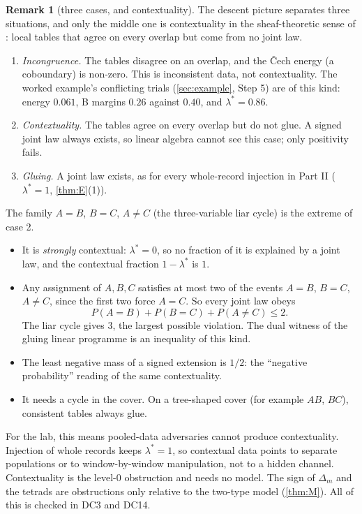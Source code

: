 \documentclass[11pt]{article}
\theoremstyle{definition}\newtheorem{definition}{Definition}\newtheorem{remark}{Remark}
\begin{document}
\begin{remark}[three cases, and contextuality]\label{rem:threecases}
The descent picture separates three situations, and only the middle one is contextuality in the sheaf-theoretic sense of
\cite{AbramskyBrandenburger2011}: local tables that agree on every overlap but come from no joint law.
\begin{enumerate}
\item \emph{Incongruence.} The tables disagree on an overlap, and the Čech energy (a coboundary) is non-zero. This is inconsistent data,
  not contextuality. The worked example's conflicting trials (\cref{sec:example}, Step 5) are of this kind: energy $0.061$, B margins
  $0.26$ against $0.40$, and $\lambda^*=0.86$.
\item \emph{Contextuality.} The tables agree on every overlap but do not glue. A signed joint law always exists, so linear algebra
  cannot see this case; only positivity fails.
\item \emph{Gluing.} A joint law exists, as for every whole-record injection in Part II ($\lambda^*=1$, \cref{thm:E}(1)).
\end{enumerate}
The family $A=B$, $B=C$, $A\ne C$ (the three-variable liar cycle) is the extreme of case 2.
\begin{itemize}
\item It is \emph{strongly} contextual: $\lambda^*=0$, so no fraction of it is explained by a joint law, and the contextual fraction
  $1-\lambda^*$ is $1$.
\item Any assignment of $A,B,C$ satisfies at most two of the events $A=B$, $B=C$, $A\ne C$, since the first two force $A=C$. So every
  joint law obeys
  \[
  P(A=B)+P(B=C)+P(A\ne C)\le2 .
  \]
  The liar cycle gives $3$, the largest possible violation. The dual witness of the gluing linear programme is an inequality of this
  kind.
\item The least negative mass of a signed extension is $1/2$: the ``negative probability'' reading of the same contextuality.
\item It needs a cycle in the cover. On a tree-shaped cover (for example $AB$, $BC$), consistent tables always glue.
\end{itemize}
For the lab, this means pooled-data adversaries cannot produce contextuality. Injection of whole records keeps $\lambda^*=1$, so
contextual data points to separate populations or to window-by-window manipulation, not to a hidden channel. Contextuality is the
level-0 obstruction and needs no model. The sign of $\Delta_m$ and the tetrads are obstructions only relative to the two-type model
(\cref{thm:M}). All of this is checked in DC3 and DC14.
\end{remark}
\end{document}
